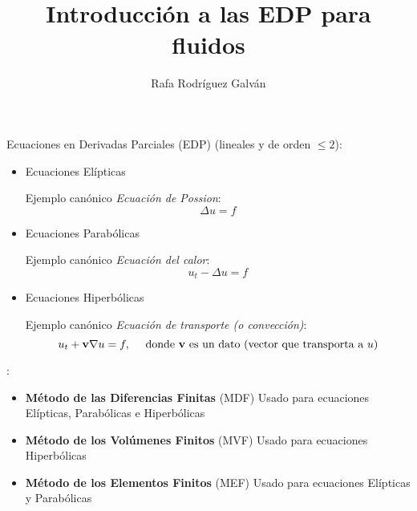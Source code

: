 \documentclass[8pt]{beamer}
\title{Introducción a las EDP para fluidos}
\author{Rafa Rodríguez Galván}
\begin{document}
\begin{frame}
\maketitle
\end{frame}
\begin{frame}{Ecuaciones en Derivadas Parciales (EDP)}
   (lineales y de orden $\le 2$):
  \begin{itemize}
      \item Ecuaciones \alert{Elípticas}
      \par
      Ejemplo canónico \emph{Ecuación de Possion}:
      $$
      \Delta u = f
      $$

      \item Ecuaciones \alert{Parabólicas}
      \par
      Ejemplo canónico \emph{Ecuación del calor}:
      $$
      u_t - \Delta u = f
      $$

      \item Ecuaciones  \alert{Hiperbólicas}
      \par
      Ejemplo canónico \emph{Ecuación de transporte (o convección)}:
      $$
      u_t + \mathbf{v} \nabla u = f, \quad\text{ donde $\mathbf{v}$ es un dato (vector que transporta a $u$)}
      $$
  \end{itemize}

  \textbf{}:
  \begin{itemize}
    \item \textbf{Método de las Diferencias Finitas} (MDF)
      Usado para ecuaciones Elípticas, Parabólicas e Hiperbólicas
    \item \textbf{Método de los Volúmenes Finitos} (MVF)
      Usado para ecuaciones Hiperbólicas
    \item \textbf{Método de los Elementos Finitos} (MEF)
      Usado para ecuaciones Elípticas y Parabólicas
    \end{itemize}
\end{frame}
\end{document}
